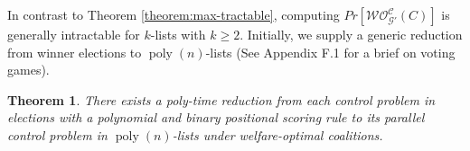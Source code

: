 \documentclass[letterpaper]{article} %
\newtheorem{theorem}{Theorem}
\newtheorem{corollary}{Corollary}
\DeclareMathOperator*{\poly}{poly}
\begin{document}

In contrast to Theorem \ref{theorem:max-tractable}, computing $Pr[\mathcal{WO}^{\mathcal{C}}_{\mathcal{G}'}(C)]$ is generally intractable for $k$-lists with $k \geq 2$. Initially, we supply a generic reduction from winner elections to $\poly(n)$-lists (See Appendix F.1 for a brief on voting games).
\begin{theorem}
\label{theorem:reduction}
There exists a poly-time reduction from each control problem in elections with a polynomial and binary positional scoring rule to its parallel control problem in $\poly(n)$-lists under welfare-optimal coalitions.
\end{theorem}
\end{document}
